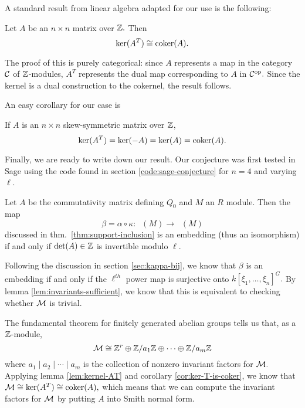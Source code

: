 \documentclass [11pt, proquest] {uwthesis}[2020/02/24]
\DeclareMathOperator{\suppc}{supp^\mathit{coh}_R}
\DeclareMathOperator{\supprR}{supp^\mathit{rnk}_R}
\begin{document}
{    A standard result from linear algebra adapted for our use is the following:
    \begin{lem}\label{lem:invariants-sufficient}
        Let $A$ be an $n\times n$ matrix over $\mathbb{Z}.$ Then
        \[\ker(A^T)\cong\operatorname{coker}(A).\]
    \end{lem}
    \begin{prf}
        The proof of this is purely categorical: since $A$ represents a map in the category $\mathcal{C}$ of $\mathbb{Z}$-modules, $A^T$ represents the dual map corresponding to $A$ in $\mathcal{C}^\text{op}.$ Since the kernel is a dual construction to the cokernel, the result follows. 
    \end{prf}
    An easy corollary for our case is
    \begin{cor}\label{cor:ker-T-is-coker}
        If $A$ is an $n\times n$ skew-symmetric matrix over $\mathbb{Z}$,
        \[\ker(A^T)=\ker(-A)=\ker(A)=\operatorname{coker}(A).\]
    \end{cor}
    
    Finally, we are ready to write down our result. Our conjecture was first tested in Sage using the code found in section \ref{code:sage-conjecture} for $n=4$ and varying $\ell$.
    \begin{thm}\label{thm:determinant-invertible}
        Let $A$ be the commutativity matrix defining $Q_0$ and $M$ an $R$ module. Then the map 
        \[\beta=\alpha\circ\kappa:\suppc(M)\to \supprR(M)\]
        discussed in thm.~\ref{thm:support-inclusion} is an embedding (thus an isomorphism) if and only if $\det(A)\in\mathbb{Z}$ is invertible modulo $\ell.$
    \end{thm}
    \begin{prf}
        Following the discussion in section \ref{sec:kappa-bij}, we know that $\beta$ is an embedding if and only if the $\ell^{th}$ power map is surjective onto $k[\xi_1,\dots,\xi_n]^G.$ By lemma \ref{lem:invariants-sufficient}, we know that this is equivalent to checking whether $\mathcal{M}$ is trivial.
        
        The fundamental theorem for finitely generated abelian groups tells us that, as a $\mathbb{Z}$-module,
        \[\mathcal{M}\cong \mathbb{Z}^r\oplus \mathbb{Z}/a_1\mathbb{Z}\oplus\cdots\oplus \mathbb{Z}/a_m\mathbb{Z}\]
        where $a_1\mid a_2\mid \cdots \mid a_m$ is the collection of nonzero invariant factors for $\mathcal{M}.$ Applying lemma \ref{lem:kernel-AT} and corollary \ref{cor:ker-T-is-coker}, we know that $\mathcal{M}\cong\ker(A^T)\cong\operatorname{coker}(A),$ which means that we can compute the invariant factors for $\mathcal{M}$ by putting $A$ into Smith normal form.
        

\end{prf}}
\end{document}

